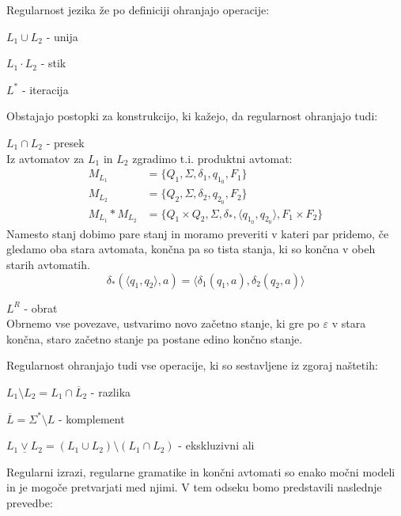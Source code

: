 Regularnost jezika že po definiciji ohranjajo operacije:
\begin{items}
\item $L_1 \cup L_2$ - unija 
\item $L_1 \cdot L_2$ - stik 
\item $L^*$ - iteracija
\end{items}
Obstajajo postopki za konstrukcijo, ki kažejo, da regularnost ohranjajo tudi:
\begin{items}
\item $L_1 \cap L_2$ - presek\\
	Iz avtomatov za $L_1$ in $L_2$ zgradimo t.i. produktni avtomat:
		\begin{align*}
			M_{L_1} &= \{ Q_1, \Sigma, \delta_1, q_{1_0}, F_1 \}\\
			M_{L_2} &= \{ Q_2, \Sigma, \delta_2, q_{2_0}, F_2 \}\\
			M_{L_1}*M_{L_2} &= \{ Q_1 \times Q_2, \Sigma, \delta_*, \langle q_{1_0}, q_{2_0} \rangle, F_1 \times F_2 \}
		\end{align*}
	Namesto stanj dobimo pare stanj in moramo preveriti v kateri par pridemo, če gledamo oba stara avtomata, končna pa so tista stanja, ki so končna v obeh starih avtomatih.
	\[ \delta_*(\langle q_1, q_2 \rangle, a) = \langle \delta_1(q_1, a), \delta_2(q_2, a)\rangle \]
\item $L^R$ - obrat\\
	Obrnemo vse povezave, ustvarimo novo začetno stanje, ki gre po $\varepsilon$ v stara končna, staro začetno stanje pa postane edino končno stanje.
\end{items}
Regularnost ohranjajo tudi vse operacije, ki so sestavljene iz zgoraj naštetih:
\begin{items}
\item $L_1 \setminus L_2 = L_1 \cap \overline L_2$ - razlika
\item $\overline{L} = \Sigma^* \setminus L$ - komplement
\item $L_1 \underline\vee L_2 = (L_1 \cup L_2) \setminus (L_1 \cap L_2)$ - ekskluzivni ali 
\end{items}

Regularni izrazi, regularne gramatike in končni avtomati so enako močni modeli in je mogoče pretvarjati med njimi. V tem odseku bomo predstavili naslednje prevedbe:\\[12pt]%
\begin{center}
\end{center}


